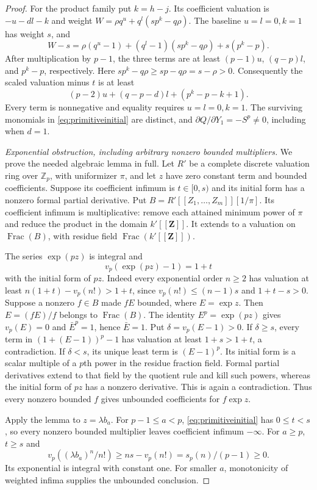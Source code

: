 \documentclass[11pt,a4paper]{article}
\theoremstyle{definition}\newtheorem{remark}[theorem]{Remark}
\newcommand{\Z}{\mathbb Z}\newcommand{\Q}{\mathbb Q}\newcommand{\F}{\mathbb F}
\newcommand{\vp}{v_p}\newcommand{\dR}{\mathrm{dR}}\newcommand{\crys}{\mathrm{crys}}
\begin{document}
\begin{proof}
For the product family put $k=h-j$. Its coefficient valuation is $-u-dl-k$ and weight
$W=\rho q^u+q^l(sp^k-q\rho)$. The baseline $u=l=0,k=1$ has weight $s$, and
\[
 W-s=\rho(q^u-1)+(q^l-1)(sp^k-q\rho)+s(p^k-p).
\]
After multiplication by $p-1$, the three terms are at least
$(p-1)u$, $(q-p)l$, and $p^k-p$, respectively. Here
$sp^k-q\rho\ge sp-q\rho=s-\rho>0$.
Consequently the scaled valuation minus $t$ is at least
\[
 (p-2)u+(q-p-d)l+(p^k-p-k+1).
\]
Every term is nonnegative and equality requires $u=l=0,k=1$.
The surviving monomials in \eqref{eq:primitiveinitial} are distinct, and
$\partial Q/\partial Y_1=-S^p\ne0$, including when $d=1$.

\emph{Exponential obstruction, including arbitrary nonzero bounded multipliers.}
We prove the needed algebraic lemma in full. Let $R'$ be a complete discrete valuation ring over $\Z_p$, with uniformizer $\pi$, and let $z$ have zero constant term and bounded coefficients. Suppose its coefficient infimum is $t\in[0,s)$ and its initial form has a nonzero formal partial derivative. Put
$B=R'[[Z_1,\ldots,Z_m]][1/\pi]$.
Its coefficient infimum is multiplicative: remove each attained minimum power of $\pi$ and reduce the product in the domain $k'[[\mathbf Z]]$. It extends to a valuation on $\operatorname{Frac}(B)$, with residue field $\operatorname{Frac}(k'[[\mathbf Z]])$.

The series $\exp(pz)$ is integral and
\[
 \vp(\exp(pz)-1)=1+t
\]
with the initial form of $pz$. Indeed every exponential order $n\ge2$ has valuation at least $n(1+t)-\vp(n!)>1+t$, since
$\vp(n!)\le(n-1)s$ and $1+t-s>0$.
Suppose a nonzero $f\in B$ made $fE$ bounded, where $E=\exp z$.
Then $E=(fE)/f$ belongs to $\operatorname{Frac}(B)$. The identity
$E^p=\exp(pz)$ gives $\vp(E)=0$ and $\bar E^p=1$, hence $\bar E=1$.
Put $\delta=\vp(E-1)>0$. If $\delta\ge s$, every term in
$(1+(E-1))^p-1$ has valuation at least $1+s>1+t$, a contradiction.
If $\delta<s$, its unique least term is $(E-1)^p$. Its initial form is a scalar multiple of a $p$th power in the residue fraction field. Formal partial derivatives extend to that field by the quotient rule and kill such powers, whereas the initial form of $pz$ has a nonzero derivative. This is again a contradiction. Thus every nonzero bounded $f$ gives unbounded coefficients for $f\exp z$.

Apply the lemma to $z=\lambda b_a$. For $p-1\le a<p$, \eqref{eq:primitiveinitial} has $0\le t<s$, so every nonzero bounded multiplier leaves coefficient infimum $-\infty$. For $a\ge p$, $t\ge s$ and
\[
 \vp((\lambda b_a)^n/n!)\ge ns-\vp(n!)
                    =s_p(n)/(p-1)\ge0.
\]
Its exponential is integral with constant one. For smaller $a$, monotonicity of weighted infima supplies the unbounded conclusion.


\end{proof}
\end{document}
